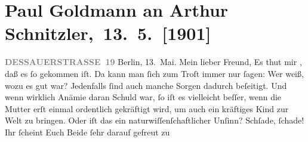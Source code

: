 

         
         \renewcommand{\erwaehntePersonen}{Personen: Robert Hirschfeld, Karl Felix Kohler, Olga Schnitzler, Heinrich Schnitzler, Louise Schnitzler}
         \renewcommand{\erwaehnteInstitutionen}{Institutionen: Neue Freie Presse}
         \renewcommand{\erwaehnteOrte}{Orte: Berlin, Dessauer Straße, Klosters Dorf, Pörtschach, Schweiz, Velden am Wörthersee, Wien, Wörthersee}
         \renewcommand{\erwaehnteWerke}{}
               \section[ Paul Goldmann an Arthur Schnitzler, 13. 5. {[}1901{]}]{ Paul Goldmann an Arthur Schnitzler, 13. 5. {[}1901{]}}\nopagebreak{}\rehead{ }\begin{ledgroupsized}[t]{13cm}\normalsize\beginnumbering \toendnotes[C]{\smallbreak\pagebreak[2]} 
\toendnotes[C]{\smallbreak}\pstart
           \noindent{}\raggedleft{}{\pb}\textcolor{gray}{\textbf{DESSAUERSTRASSE 19}}\pend
           \pstart
           Berlin, 13. Mai.\pend
           \pstart\center{}Mein lieber Freund,\pend\pstart
           Es thut mir \label{K_L03066-1v}\label{K_L03066-1h}, daß es ſo gekommen
               iſt. Da kann man ſich zum Troſt immer nur ſagen: Wer weiß, wozu es gut war?
               Jedenfalls ſind auch manche Sorgen dadurch beſeitigt. Und wenn wirklich Anämie daran
               Schuld war, ſo iſt es vielleicht beſſer, wenn die Mutter erſt einmal ordentlich gekräftigt wird, um {\pb}auch ein kräftiges Kind zur Welt zu bringen. Oder
               iſt das ein naturwiſſenſchaftlicher Unſinn? Schſade, ſchade! Ihr ſcheint Euch Beide ſehr darauf gefreut zu

\end{ledgroupsized}
